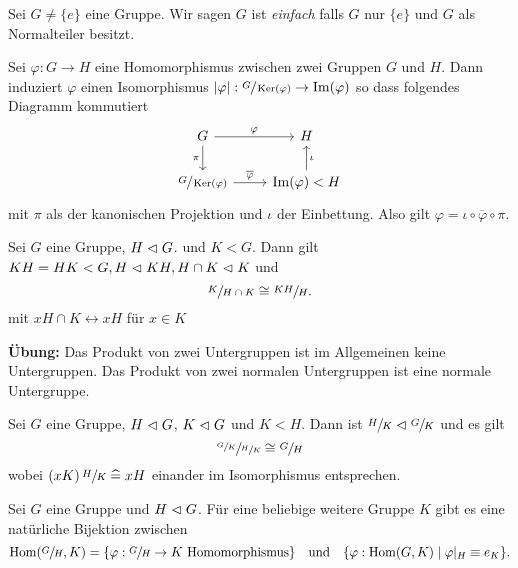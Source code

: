 \begin{definition}
	Sei $G \neq \{e\} $ eine Gruppe. Wir sagen $ G$ ist \emph{einfach} falls $G$ nur $\{e\} $ und $G$ als Normalteiler besitzt.
\end{definition}



\begin{theorem}
	Sei $\varphi: G \to H$ eine Homomorphismus zwischen zwei Gruppen $G$ und $H$.
	Dann induziert $\varphi$ einen Isomorphismus $\abs{\varphi}: \sfrac{G}{\operatorname{Ker}(\varphi)} \to  \Im(\varphi)$ so dass 
	folgendes Diagramm kommutiert
	\[
	\begin{tikzcd}
		G \arrow[d, "\pi"'] \arrow[r, "\varphi"]                 & H                                    \\
	\sfrac{G}{\ker(\varphi)} \arrow[r, "\overline{\varphi}"] & \Im(\varphi) < H \arrow[u, "\iota"']
		\end{tikzcd}
	\] 
	mit $\pi$ als der kanonischen Projektion und $\iota$ der Einbettung.
	Also gilt $\varphi = \iota \circ \overline{\varphi} \circ \pi$.
\end{theorem}



\begin{corollary}
	Sei $G$ eine Gruppe, $H \vartriangleleft G$. und $K < G$.
	Dann gilt $K H = H K < G, H \vartriangleleft KH, H \cap K \vartriangleleft K $ und 
	\[
	\sfrac{K}{H \cap K} \cong \sfrac{KH}{H}
	.\] 
	mit $x H \cap K \leftrightarrow x H$ für $x \in K$
\end{corollary}


\textbf{Übung:}
 Das Produkt von zwei Untergruppen ist im Allgemeinen keine Untergruppen.
 Das Produkt von zwei normalen Untergruppen ist eine normale Untergruppe.

 \begin{corollary}
 	Sei $G$ eine Gruppe, $H \vartriangleleft G$, $K \vartriangleleft G$ und $K < H$.
	Dann ist $\sfrac{H}{K} \vartriangleleft \sfrac{G}{K}$ und es gilt
	\[
	\sfrac{\sfrac{G}{K}}{\sfrac{H}{K}} \cong \sfrac{G}{H}
	\] 
	wobei $(xK) \, \sfrac{H}{K} \; \widehat{=} \; x H$ einander im Isomorphismus entsprechen.
 \end{corollary}


\begin{corollary}
	Sei $G$ eine Gruppe und $H \vartriangleleft G$.
	Für eine beliebige weitere Gruppe $K$ gibt es eine natürliche Bijektion zwischen 
	\[
		\hom(\sfrac{G}{H},K) = \{ \varphi: \sfrac{G}{H} \to K \text{ Homomorphismus}\} \qq{und} \{\varphi: \hom(G,K) \mid \varphi \vert_{H} \equiv e_{K}\} 
	.\] 
\end{corollary}

